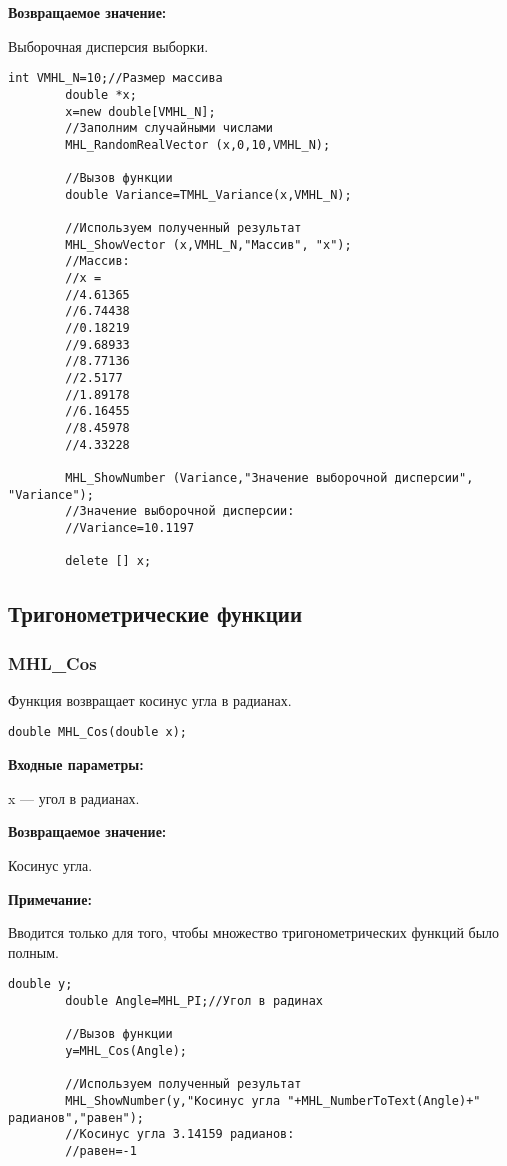 \documentclass[a4paper,12pt]{article}
\begin{document}
\textbf{Возвращаемое значение:}
 
Выборочная дисперсия выборки.


\begin{lstlisting}[label=code_use_TMHL_Variance,caption=Пример использования]
        int VMHL_N=10;//Размер массива
        double *x;
        x=new double[VMHL_N];
        //Заполним случайными числами
        MHL_RandomRealVector (x,0,10,VMHL_N);

        //Вызов функции
        double Variance=TMHL_Variance(x,VMHL_N);

        //Используем полученный результат
        MHL_ShowVector (x,VMHL_N,"Массив", "x");
        //Массив:
        //x =
        //4.61365
        //6.74438
        //0.18219
        //9.68933
        //8.77136
        //2.5177
        //1.89178
        //6.16455
        //8.45978
        //4.33228

        MHL_ShowNumber (Variance,"Значение выборочной дисперсии", "Variance");
        //Значение выборочной дисперсии:
        //Variance=10.1197

        delete [] x;
\end{lstlisting}

\subsection{Тригонометрические функции}

\subsubsection{MHL\_Cos}\label{MHL_Cos}

Функция возвращает косинус угла в радианах.


\begin{lstlisting}[label=code_syntax_MHL_Cos,caption=Синтаксис]
double MHL_Cos(double x);
\end{lstlisting}

\textbf{Входные параметры:}

 x --- угол в радианах.

\textbf{Возвращаемое значение:}

Косинус угла.

\textbf{Примечание:}

Вводится только для того, чтобы множество тригонометрических функций было полным.


\begin{lstlisting}[label=code_use_MHL_Cos,caption=Пример использования]
        double y;
        double Angle=MHL_PI;//Угол в радинах

        //Вызов функции
        y=MHL_Cos(Angle);

        //Используем полученный результат
        MHL_ShowNumber(y,"Косинус угла "+MHL_NumberToText(Angle)+" радианов","равен");
        //Косинус угла 3.14159 радианов:
        //равен=-1
\end{lstlisting}
\end{document}
